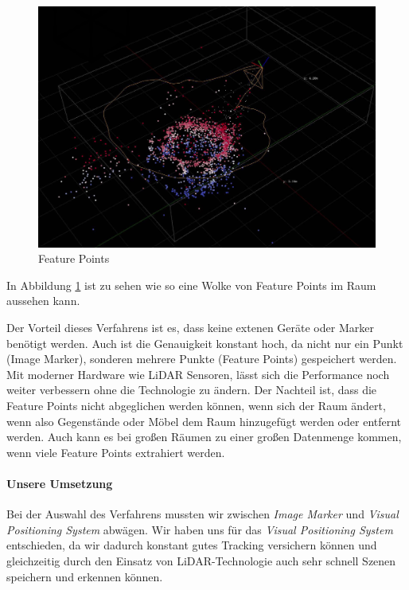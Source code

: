 \documentclass[titlepage, a4paper, 11pt]{scrartcl}
\begin{document}
  \begin{figure}[h]
    \centering
    \includegraphics[width=.5\textwidth]{arworldmap-featurepoints}
    \caption{Feature Points}
    \label{FeaturePoints}
  \end{figure}

  In Abbildung \ref{FeaturePoints} ist zu sehen wie so eine Wolke von Feature Points im Raum aussehen kann.

  Der Vorteil dieses Verfahrens ist es, dass keine extenen Geräte oder Marker benötigt werden. Auch ist die Genauigkeit konstant hoch, da nicht nur ein Punkt (Image Marker), sonderen mehrere Punkte (Feature Points) gespeichert werden. Mit moderner Hardware wie LiDAR Sensoren, lässt sich die Performance noch weiter verbessern ohne die Technologie zu ändern.
  Der Nachteil ist, dass die Feature Points nicht abgeglichen werden können, wenn sich der Raum ändert, wenn also Gegenstände oder Möbel dem Raum hinzugefügt werden oder entfernt werden.
  Auch kann es bei großen Räumen zu einer großen Datenmenge kommen, wenn viele Feature Points extrahiert werden.

  \paragraph{Unsere Umsetzung}

  Bei der Auswahl des Verfahrens mussten wir zwischen \textit{Image Marker} und \textit{Visual Positioning System} abwägen.
  Wir haben uns für das \textit{Visual Positioning System} entschieden, da wir dadurch konstant gutes Tracking versichern können und
  gleichzeitig durch den Einsatz von LiDAR-Technologie auch sehr schnell Szenen speichern und erkennen können.
\end{document}

